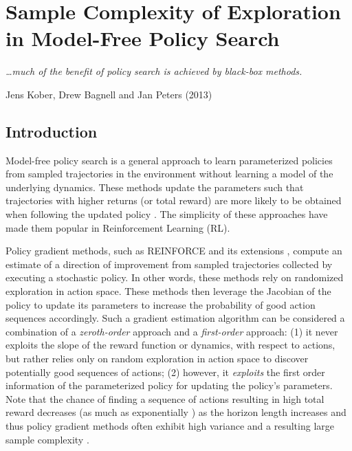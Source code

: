 
\chapter{Sample Complexity of Exploration in Model-Free Policy Search}
\label{cha:sample-compl-expl}

\epigraph{\textit{\ldots much of the benefit of policy search is achieved
by black-box methods.}}{Jens Kober, Drew Bagnell and Jan Peters (2013)}

\section{Introduction}
Model-free policy search is a general approach to learn parameterized
policies from sampled trajectories in the environment without
learning a model of the underlying dynamics. These methods
update the parameters such that trajectories with higher returns (or total reward) are
more likely to be obtained when following the updated policy
\citep{kober2013reinforcement}. The simplicity of these approaches have
made them popular in Reinforcement Learning (RL).

Policy gradient methods, such as REINFORCE \citep{williams1992simple}
and its extensions \citep{kakade2002natural,bagnell2004policy, silver2014deterministic,schulman2015trust},
compute an estimate of a direction of improvement from sampled
trajectories collected by executing a stochastic policy. In other words, these methods rely on
randomized exploration in action space. These methods then leverage
the Jacobian of the policy to update its parameters to increase the
probability of good action sequences accordingly. Such a gradient
estimation algorithm can be considered a combination of a
\textit{zeroth-order} approach and a \textit{first-order} approach:
(1) it never exploits the slope of the reward function or dynamics,
with respect to actions, but rather relies only on random exploration
in action space to discover potentially good sequences of actions; (2)
however, it \emph{exploits} the first order information of the
parameterized policy for updating the policy's parameters. Note that
the chance of finding a sequence of actions resulting in high total
reward decreases (as much as exponentially
\citep{kakade2002approximately}) as the horizon length increases and
thus policy gradient methods often exhibit high variance and a
resulting large sample complexity \citep{peters2008reinforcement,
  zhao2011analysis}.

